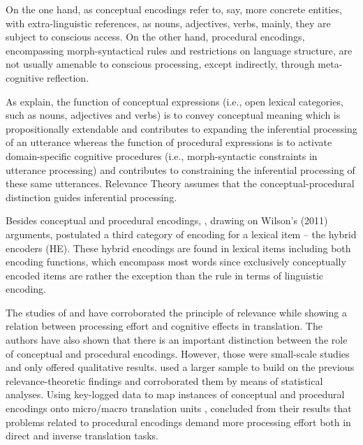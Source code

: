 \documentclass[output=paper]{langsci/langscibook}
\begin{document}
On the one hand, as conceptual encodings refer to, say, more concrete entities, with extra-linguistic references, as nouns, adjectives, verbs, mainly, they are subject to conscious access. On the other hand, procedural encodings, encompassing morph-syntactical rules and restrictions on language structure, are not usually amenable to conscious processing, except indirectly, through meta-cognitive reflection. 



As \citet{Alves2014} explain, the function of conceptual expressions (i.e., open lexical categories, such as nouns, adjectives and verbs) is to convey conceptual meaning which is propositionally extendable and contributes to expanding the inferential processing of an utterance whereas the function of procedural expressions is to activate domain-specific cognitive procedures (i.e., morph-syntactic constraints in utterance processing) and contributes to constraining the inferential processing of these same utterances. Relevance Theory assumes that the conceptual-procedural distinction guides inferential processing. \citep[p. 155]{Alves2014}  



Besides conceptual and procedural encodings, \citet{alves2013}, drawing on Wilson’s (2011) arguments, postulated a third category of encoding for a lexical item – the hybrid encoders (HE). These hybrid encodings are found in lexical items including both encoding functions, which encompass most words since exclusively conceptually encoded items are rather the exception than the rule in terms of linguistic encoding.



The studies of \citet{alves2007cognitive} and \citet{alves2003} have corroborated the principle of relevance while showing a relation between processing effort and cognitive effects in translation. The authors have also shown that there is an important distinction between the role of conceptual and procedural encodings.  However, those were small-scale studies and only offered qualitative results. \citet{alves2013} used a larger sample to build on the previous relevance-theoretic findings and corroborated them by means of statistical analyses. Using key-logged data to map instances of conceptual and procedural encodings onto micro/macro translation units \citep{alves2009, alves2011}, \citet{alves2013} concluded from their results that problems related to procedural encodings demand more processing effort both in direct and inverse translation tasks.
\end{document}
